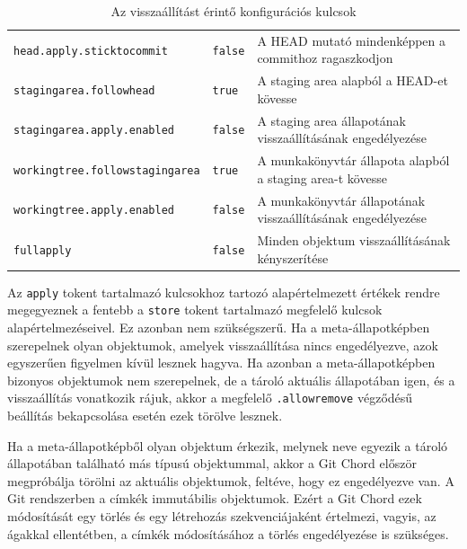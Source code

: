 \documentclass[
]{elteikthesis}[2025/03/25]
\begin{document}
\begin{table}[p]
\begin{center}
\begin{tabular}{|l|l|p{4.5cm}|}
 \texttt{head.apply.sticktocommit} & \texttt{false} & A HEAD mutató mindenképpen a commithoz ragaszkodjon\vspace{0.5em} \\
 \texttt{stagingarea.followhead} & \texttt{true} & A staging area alapból a HEAD-et kövesse\vspace{0.5em} \\
 \texttt{stagingarea.apply.enabled} & \texttt{false} & A staging area állapotának visszaállításának engedélyezése\vspace{0.5em} \\
 \texttt{workingtree.followstagingarea} & \texttt{true} & A munkakönyvtár állapota alapból a staging area-t kövesse\vspace{0.5em} \\
 \texttt{workingtree.apply.enabled} & \texttt{false} & A munkakönyvtár állapotának visszaállításának engedélyezése\vspace{0.5em} \\
 \texttt{fullapply} & \texttt{false} & Minden objektum visszaállításának kényszerítése \\

 \hline

\end{tabular}
\end{center}
\caption{Az visszaállítást érintő konfigurációs kulcsok}
\label{tab:apply-config-keys}
\end{table}

Az \verb|apply| tokent tartalmazó kulcsokhoz tartozó alapértelmezett értékek
rendre megegyeznek a fentebb a \verb|store| tokent tartalmazó megfelelő kulcsok alapértelmezéseivel.
Ez azonban nem szükségszerű.
Ha a meta-állapotképben szerepelnek olyan objektumok, amelyek visszaállítása nincs engedélyezve,
azok egyszerűen figyelmen kívül lesznek hagyva.
Ha azonban a meta-állapotképben bizonyos objektumok nem szerepelnek,
de a tároló aktuális állapotában igen,
és a visszaállítás vonatkozik rájuk,
akkor a megfelelő \verb|.allowremove| végződésű beállítás bekapcsolása esetén ezek törölve lesznek.

Ha a meta-állapotképből olyan objektum érkezik, melynek neve egyezik a tároló állapotában található más típusú objektummal,
akkor a Git Chord először megpróbálja törölni az aktuális objektumok,
feltéve, hogy ez engedélyezve van.
A Git rendszerben a címkék immutábilis objektumok.
Ezért a Git Chord ezek módosítását egy törlés és egy létrehozás szekvenciájaként értelmezi,
vagyis, az ágakkal ellentétben,
a címkék módosításához a törlés engedélyezése is szükséges.
\end{document}
